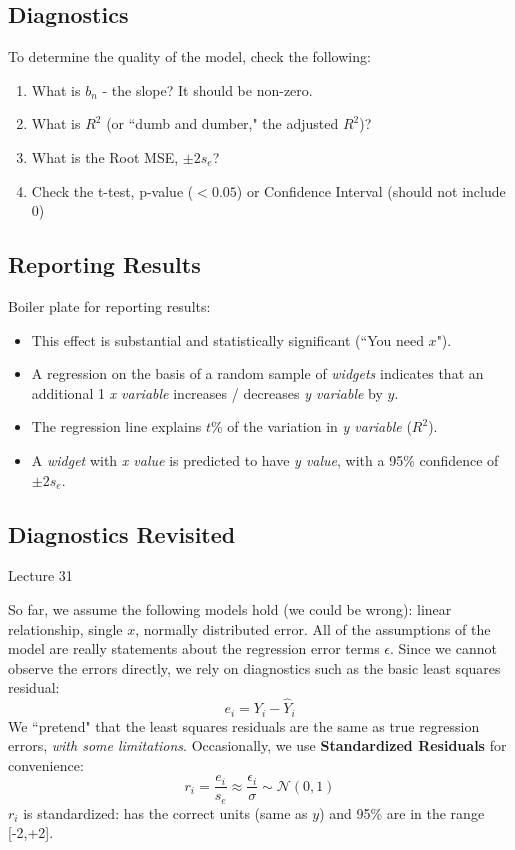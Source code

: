 \documentclass[11pt, oneside]{article}   	%
\begin{document}
\subsection{Diagnostics}

To determine the quality of the model, check the following:
\begin{enumerate}
\item{What is $b_n$ - the slope? It should be non-zero.}
\item{What is $R^2$ (or ``dumb and dumber," the adjusted $R^2$)?}
\item{What is the Root MSE, $\pm 2 s_e$?}
\item{Check the t-test, p-value ($< 0.05$) or Confidence Interval (should not include 0)}
\end{enumerate}

\subsection{Reporting Results}

Boiler plate for reporting results:

\begin{itemize}

\item{This effect is substantial and statistically significant (``You need $x$").}

\item{A regression on the basis of a random sample of \textit{widgets} indicates that an additional 1
\textit{x variable} increases / decreases \textit{y variable} by $\hat{y}$.}

\item{The regression line explains $t \%$ of the variation in \textit{y variable} ($R^2$).}

\item{A \textit{widget} with \textit{x value} is predicted to have \textit{y value}, with a 95\% confidence of $\pm 2s_e$.}
\end{itemize}

\subsection{Diagnostics Revisited}
Lecture 31

So far, we assume the following models hold (we could be wrong): linear relationship, single $x$, normally distributed error. All of the assumptions of the model are really statements about the regression error terms $\epsilon$. Since we cannot observe the errors directly, we rely on diagnostics such as the basic least squares residual:
\[
e_i = Y_i - \hat{Y}_i
\]
We ``pretend" that the least squares residuals are the same as true regression errors, \textit{with some limitations}. Occasionally, we use \textbf{Standardized Residuals} for convenience:
\[
r_i = \frac{e_i}{s_e} \approx \frac{\epsilon_i}{\sigma} \sim \mathcal{N}(0,1)
\]
$r_i$ is standardized: has the correct units (same as $y$) and 95\% are in the range [-2,+2]. 
\end{document}

